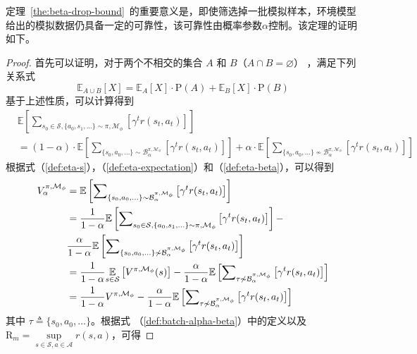 定理~\ref{the:beta-drop-bound}~的重要意义是，即使筛选掉一批模拟样本，环境模型给出的模拟数据仍具备一定的可靠性，该可靠性由概率参数$\alpha$控制。该定理的证明如下。

\begin{proof}


首先可以证明，对于两个不相交的集合 $A$ 和 $B$（$A\cap B=\varnothing$） ，满足下列关系式
\begin{equation}
    \mathbb{E}_{A\cup B}\left[X\right] = \mathbb{E}_A\left[X\right]\cdot\mathrm{P}\left(A\right)+\mathbb{E}_B\left[X\right]\cdot\mathrm{P}\left(B\right)
\end{equation}
基于上述性质，可以计算得到
\begin{align}
    &\mathbb{E}\left[{\sum}_{s_0\in\mathcal{S},\{a_0,s_1,\ldots\} \sim\pi,\mathcal{M}_\phi}\left[\gamma^t r(s_t,a_t)\right]\right] \\
    &= (1-\alpha)\cdot \mathbb{E}\left[{\sum}_{\{s_0,a_0,\ldots\} \sim\mathcal{B}_\alpha^{\pi,\mathcal{M}_\phi}}\left[\gamma^t r(s_t,a_t)\right]\right] + \alpha\cdot\mathbb{E}\left[{\sum}_{\{s_0,a_0,\ldots\} \not\sim\mathcal{B}_\alpha^{\pi,\mathcal{M}_\phi}}\left[\gamma^t r(s_t,a_t)\right]\right]
\end{align}
根据式（\ref{def:eta-s}），（\ref{def:eta-expectation}）和（\ref{def:eta-beta}），可以得到
\begin{align}
{V}^{\pi,\mathcal{M}_\phi}_\alpha&=\mathbb{E}\left[{\sum}_{\{s_0,a_0,\ldots\} \sim\mathcal{B}_\alpha^{\pi,\mathcal{M}_\phi}}\left[\gamma^t r(s_t,a_t)\right]\right]\\
&=\frac{1}{1-\alpha}\mathbb{E}\left[{\sum}_{s_0\in\mathcal{S},\{a_0,s_1,\ldots\} \sim\pi,\mathcal{M}_\phi}\left[\gamma^t r(s_t,a_t)\right]\right]-\notag\\
&\frac{\alpha}{1-\alpha}\mathbb{E}\left[{\sum}_{\{s_0,a_0,\ldots\} \not\sim\mathcal{B}_\alpha^{\pi,\mathcal{M}_\phi}}\left[\gamma^t r(s_t,a_t)\right]\right]\\
&=\frac{1}{1-\alpha}\underset{s\in{\mathcal{S}}}{\mathbb{E}}\left[{V}^{\pi,\mathcal{M}_\phi}(s)\right]-\frac{\alpha}{1-\alpha}\mathbb{E}\left[{\sum}_{\tau \not\sim\mathcal{B}_\alpha^{\pi,\mathcal{M}_\phi}}\left[\gamma^t r(s_t,a_t)\right]\right]\\
&=\frac{1}{1-\alpha}{V}^{\pi,\mathcal{M}_\phi}-\frac{\alpha}{1-\alpha}\mathbb{E}\left[{\sum}_{\tau \not\sim\mathcal{B}_\alpha^{\pi,\mathcal{M}_\phi}}\left[\gamma^t r(s_t,a_t)\right]\right]\label{proof:lem42p1}
\end{align}
其中 $\tau\triangleq\{s_0,a_0,\ldots\}$。根据式 （\ref{def:batch-alpha-beta}）中的定义以及  $\mathrm{R}_{m}=\underset{s\in\mathcal{S},a\in\mathcal{A}}{\sup}r(s,a)$，可得

\end{proof}
